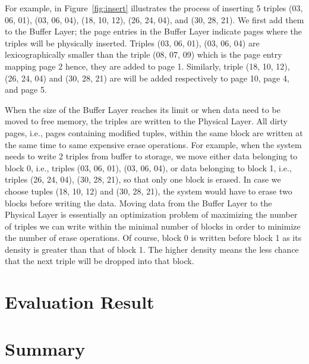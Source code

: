 For example, in Figure~\ref{fig:insert} illustrates the process of inserting 5 triples (03, 06, 01), (03, 06, 04), (18, 10, 12), (26, 24, 04), and (30, 28, 21). We first add them to the Buffer Layer; the page entries in the Buffer Layer indicate pages where the triples will be physically inserted. Triples (03, 06, 01), (03, 06, 04) are lexicographically smaller than the triple (08, 07, 09) which is the page entry mapping page 2 hence, they are added to page 1. Similarly, triple (18, 10, 12), (26, 24, 04) and (30, 28, 21) are will be added respectively to page 10, page 4, and page 5. 

When the size of the Buffer Layer reaches its limit or when data need to be moved to free memory, the triples are written to the Physical Layer. All dirty pages, i.e., pages containing modified tuples, within the same block are written at the same time to same expensive erase operations. For example, when the system needs to write 2 triples from buffer to storage, we move either data belonging to block 0, i.e., triples (03, 06, 01), (03, 06, 04), or data belonging to block 1, i.e., triples (26, 24, 04), (30, 28, 21), so that only one block is erased. In case we choose tuples (18, 10, 12) and (30, 28, 21), the system would have to erase two blocks before writing the data. Moving data from the Buffer Layer to the Physical Layer is essentially an optimization problem of maximizing the number of triples we can write within the minimal number of blocks in order to minimize the number of erase operations. Of course, block 0 is written before block 1 as its density is greater than that of block 1. The higher density means the less chance that the next triple will be dropped into that block.




\section{Evaluation Result}

\section{Summary}






